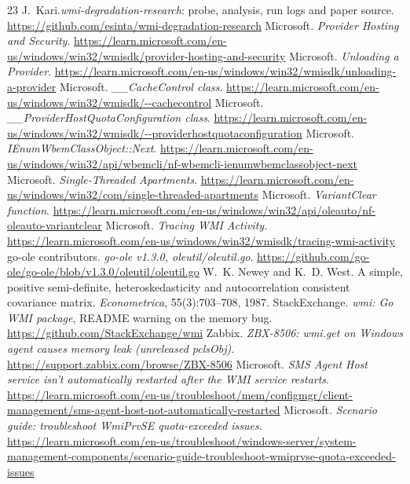\documentclass[letterpaper,twocolumn,10pt]{article}
\begin{document}
\footnotesize\raggedright
\begin{thebibliography}{23}\setlength{\itemsep}{0pt}
 J.~Kari.\emph{wmi-degradation-research}: probe, analysis, run logs and paper source. \url{https://github.com/esinta/wmi-degradation-research}
 Microsoft. \emph{Provider Hosting and Security}. \url{https://learn.microsoft.com/en-us/windows/win32/wmisdk/provider-hosting-and-security}
 Microsoft. \emph{Unloading a Provider}. \url{https://learn.microsoft.com/en-us/windows/win32/wmisdk/unloading-a-provider}
 Microsoft. \emph{\_\_CacheControl class}. \url{https://learn.microsoft.com/en-us/windows/win32/wmisdk/--cachecontrol}
 Microsoft. \emph{\_\_ProviderHostQuotaConfiguration class}. \url{https://learn.microsoft.com/en-us/windows/win32/wmisdk/--providerhostquotaconfiguration}
 Microsoft. \emph{IEnumWbemClassObject::Next}. \url{https://learn.microsoft.com/en-us/windows/win32/api/wbemcli/nf-wbemcli-ienumwbemclassobject-next}
 Microsoft. \emph{Single-Threaded Apartments}. \url{https://learn.microsoft.com/en-us/windows/win32/com/single-threaded-apartments}
 Microsoft. \emph{VariantClear function}. \url{https://learn.microsoft.com/en-us/windows/win32/api/oleauto/nf-oleauto-variantclear}
 Microsoft. \emph{Tracing WMI Activity}. \url{https://learn.microsoft.com/en-us/windows/win32/wmisdk/tracing-wmi-activity}
 go-ole contributors. \emph{go-ole v1.3.0, oleutil/oleutil.go}. \url{https://github.com/go-ole/go-ole/blob/v1.3.0/oleutil/oleutil.go}
 W.~K. Newey and K.~D. West. A simple, positive semi-definite, heteroskedasticity and autocorrelation consistent covariance matrix. \emph{Econometrica}, 55(3):703--708, 1987.
 StackExchange. \emph{wmi: Go WMI package}, README warning on the memory bug. \url{https://github.com/StackExchange/wmi}
 Zabbix. \emph{ZBX-8506: wmi.get on Windows agent causes memory leak (unreleased pclsObj)}. \url{https://support.zabbix.com/browse/ZBX-8506}
 Microsoft. \emph{SMS Agent Host service isn't automatically restarted after the WMI service restarts}. \url{https://learn.microsoft.com/en-us/troubleshoot/mem/configmgr/client-management/sms-agent-host-not-automatically-restarted}
 Microsoft. \emph{Scenario guide: troubleshoot WmiPrvSE quota-exceeded issues}. \url{https://learn.microsoft.com/en-us/troubleshoot/windows-server/system-management-components/scenario-guide-troubleshoot-wmiprvse-quota-exceeded-issues}

\end{thebibliography}
\end{document}
